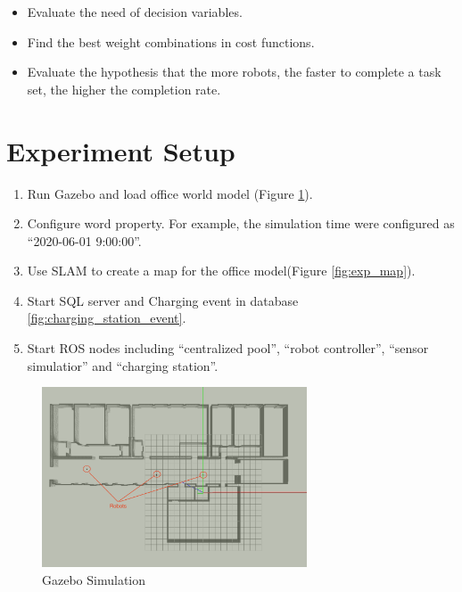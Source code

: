 \begin{itemize}
	\item Evaluate the need of decision variables.
	\item Find the best weight combinations in cost functions.
	\item Evaluate the hypothesis that the more robots, the faster to complete a task set, the higher the completion rate.
\end{itemize}

\section{Experiment Setup}

\begin{enumerate}
    \item Run Gazebo and load office world model (Figure \ref{fig:gazebo_model}). 
    \item Configure word property. For example, the simulation time were configured as ``2020-06-01 9:00:00''.
    \item Use SLAM \cite{slam} to create a map for the office model(Figure \ref{fig:exp_map}).
    \item Start SQL server and Charging event in database \ref{fig:charging_station_event}.
    \item Start ROS nodes including ``centralized pool'', ``robot controller'', ``sensor simulatior'' and ``charging station''.
\end{enumerate}

\begin{figure}[htbp]
	\centering
	\includegraphics[width = 0.7\textwidth]{content/images/ch5/gazebo_model.png}
	\caption{Gazebo Simulation}
	\label{fig:gazebo_model}
\end{figure}

